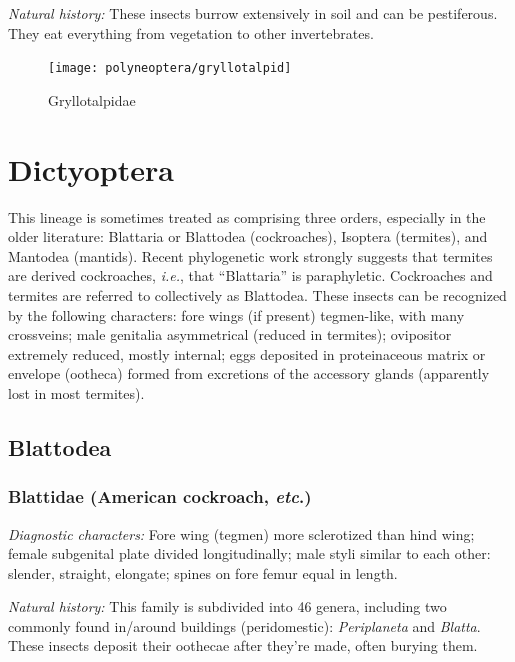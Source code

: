 \noindent{}\textit{Natural history:} These insects burrow extensively in soil and can be pestiferous. They eat everything from vegetation to other invertebrates.\vspace{3mm}

\begin{figure}[ht!]
  \centering
    \texttt{[image: polyneoptera/gryllotalpid]}
  \caption{Gryllotalpidae \citep[modified from][Plate VII, Fig. 2]{bhlitem82061AustrInsect}}
  \label{fig:gryllotalp}
\end{figure}

\section{Dictyoptera}
This lineage is sometimes treated as comprising three orders, especially in the older literature: Blattaria or Blattodea (cockroaches), Isoptera (termites), and Mantodea (mantids). Recent phylogenetic work strongly suggests that termites are derived cockroaches, \textit{i.e.}, that ``Blattaria'' is paraphyletic. Cockroaches and termites are referred to collectively as Blattodea. These insects can be recognized by the following characters: fore wings (if present) tegmen-like, with many crossveins; male genitalia asymmetrical (reduced in termites); ovipositor extremely reduced, mostly internal; eggs deposited in proteinaceous matrix or envelope (ootheca) formed from excretions of the accessory glands (apparently lost in most termites).

\subsection{Blattodea}
\subsubsection{Blattidae (American cockroach, \textit{etc}.)}
\noindent{}\textit{Diagnostic characters:} Fore wing (tegmen) more sclerotized than hind wing; female subgenital plate divided longitudinally; male styli similar to each other: slender, straight, elongate; spines on fore femur equal in length.\vspace{3mm}

\noindent{}\textit{Natural history:} This family is subdivided into 46 genera, including two commonly found in/around buildings (peridomestic): \textit{Periplaneta} and \textit{Blatta}. These insects deposit their oothecae after they're made, often burying them. \vspace{3mm}


